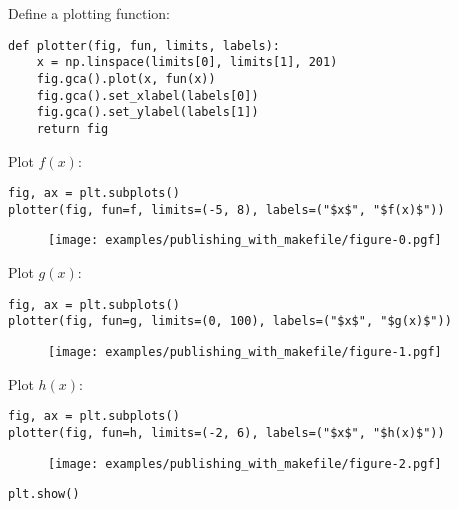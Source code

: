 Define a plotting function:

\label{f3c13bb1}
\nointerlineskip\nointerlineskip\begin{verbatim}
def plotter(fig, fun, limits, labels):
    x = np.linspace(limits[0], limits[1], 201)
    fig.gca().plot(x, fun(x))
    fig.gca().set_xlabel(labels[0])
    fig.gca().set_ylabel(labels[1])
    return fig
\end{verbatim}

\label{183e64db}
Plot $f(x)$:

\label{4177c6f7}
\nointerlineskip\nointerlineskip\begin{verbatim}
fig, ax = plt.subplots()
plotter(fig, fun=f, limits=(-5, 8), labels=("$x$", "$f(x)$"))
\end{verbatim}

\label{153d3c39}
\gdef\graphicslist{}%
\begin{figure}[htbp]
\centering
\texttt{[image: examples/publishing\_with\_makefile/figure-0.pgf]}
\end{figure}

\label{da864b18}
Plot $g(x)$:

\label{4d361ec9}
\nointerlineskip\nointerlineskip\begin{verbatim}
fig, ax = plt.subplots()
plotter(fig, fun=g, limits=(0, 100), labels=("$x$", "$g(x)$"))
\end{verbatim}

\label{152a65db}
\gdef\graphicslist{}%
\begin{figure}[htbp]
\centering
\texttt{[image: examples/publishing\_with\_makefile/figure-1.pgf]}
\end{figure}

\label{20e39314}
Plot $h(x)$:

\label{e9c07c63}
\nointerlineskip\nointerlineskip\begin{verbatim}
fig, ax = plt.subplots()
plotter(fig, fun=h, limits=(-2, 6), labels=("$x$", "$h(x)$"))
\end{verbatim}

\label{8946a2cf}
\gdef\graphicslist{}%
\begin{figure}[htbp]
\centering
\texttt{[image: examples/publishing\_with\_makefile/figure-2.pgf]}
\end{figure}

\label{6e121eae}
\nointerlineskip\nointerlineskip\begin{verbatim}
plt.show()
\end{verbatim}
